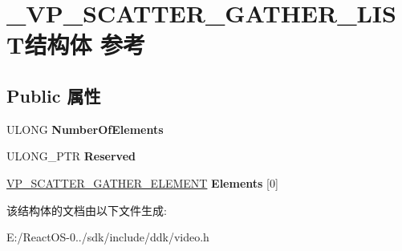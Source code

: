 \hypertarget{struct___v_p___s_c_a_t_t_e_r___g_a_t_h_e_r___l_i_s_t}{}\section{\+\_\+\+V\+P\+\_\+\+S\+C\+A\+T\+T\+E\+R\+\_\+\+G\+A\+T\+H\+E\+R\+\_\+\+L\+I\+S\+T结构体 参考}
\label{struct___v_p___s_c_a_t_t_e_r___g_a_t_h_e_r___l_i_s_t}
\subsection*{Public 属性}
\begin{DoxyCompactItemize}
\item 
\mbox{\label{struct___v_p___s_c_a_t_t_e_r___g_a_t_h_e_r___l_i_s_t_a08445bc1b31bcdfb0eef76f09cff44d7}} 
U\+L\+O\+NG {\bfseries Number\+Of\+Elements}
\item 
\mbox{\label{struct___v_p___s_c_a_t_t_e_r___g_a_t_h_e_r___l_i_s_t_a5e0a3cff3cd1609c3597d55ea8245fd1}} 
U\+L\+O\+N\+G\+\_\+\+P\+TR {\bfseries Reserved}
\item 
\mbox{\label{struct___v_p___s_c_a_t_t_e_r___g_a_t_h_e_r___l_i_s_t_a0ae9d253eb70492cca9950686b2f1d5e}} 
\hyperlink{struct___v_p___s_c_a_t_t_e_r___g_a_t_h_e_r___e_l_e_m_e_n_t}{V\+P\+\_\+\+S\+C\+A\+T\+T\+E\+R\+\_\+\+G\+A\+T\+H\+E\+R\+\_\+\+E\+L\+E\+M\+E\+NT} {\bfseries Elements} \mbox{[}0\mbox{]}
\end{DoxyCompactItemize}


该结构体的文档由以下文件生成\+:\begin{DoxyCompactItemize}
\item 
E\+:/\+React\+O\+S-\/0../sdk/include/ddk/video.\+h\end{DoxyCompactItemize}
